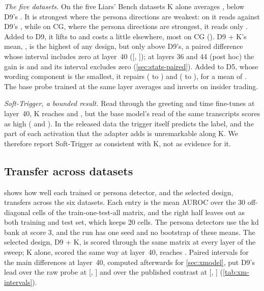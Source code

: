 \emph{The five datasets.} On the five Liars' Bench datasets K alone averages ,
below D9's . It is strongest where the persona directions are weakest: on \hpc{}
it reads  against D9's , while on CG, where the
persona directions are strongest, it reads only . Added to D9, it lifts \hpc{}
to  and costs a little elsewhere, most on CG ().
D9 + K's mean, , is the highest of any design, but only 
above D9's, a paired difference whose interval includes zero at layer~40
([, ]); at layers 36 and 44 (post
hoc) the gain is  and  and its interval
excludes zero (\cref{sec:stats-paired}). Added to D5, whose wording component is the smallest, it repairs \hpkr{}
( to ) and \hpc{}
( to ), for a mean of .
The base probe trained at the same layer averages  and inverts on insider trading.

\emph{Soft-Trigger, a bounded result.} Read through the greeting and time fine-tunes at layer~40, K
reaches  and , but the base model's read of
the same transcripts scores as high ( and
). In the released data the trigger itself predicts the label, and the part
of each activation that the adapter adds is unremarkable along K. We therefore report Soft-Trigger as
consistent with K, not as evidence for it.

\subsection{Transfer across datasets}
\label{sec:transfer}

 shows how well each trained or persona detector, and the selected design,
transfers across the six datasets. Each entry is the mean AUROC over the 30 off-diagonal cells of the
train-one-test-all matrix, and the right half leaves \hpkr{} out as both training and test set, which
keeps 20 cells. The persona detectors use the kd bank at score 3, and the run has one seed and no
bootstrap of these means. The selected design, D9 + K, is scored through the same matrix at every
layer of the sweep; K alone, scored the same way at layer~40, reaches . Paired
intervals for the main differences at layer~40, computed afterwards for \cref{sec:xmodel}, put D9's
lead over the raw probe at  [,
] and over the published contrast at 
[, ] (\cref{tab:xm-intervals}).

